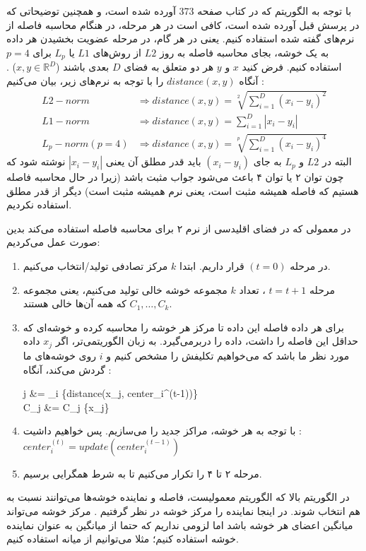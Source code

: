 \documentclass[a4paper, 12pt]{article}
\begin{document}
	
	با توجه به الگوریتم 
	که در کتاب 
	\cite{book}
	صفحه  373
	آورده شده است، و همچنین توضیحاتی که در پرسش قبل آورده شده است، کافی است در هر مرحله، در هنگام محاسبه فاصله از نرم‌های گفته شده استفاده کنیم. یعنی در هر گام، در مرحله عضویت بخشیدن هر داده به یک خوشه، بجای محاسبه فاصله به روز 
	$L2$
	از روش‌های 
	$L1$
	یا
	$L_p$
	برای 
	$p=4$
	استفاده کنیم. فرض کنید 
	$x$
	و
	$y$
	هر دو متعلق به فضای $D$ بعدی باشند 
	($x,y \in \mathbb{R}^D$)
	. آنگاه 
	$distance(x,y)$
	را با توجه به نرم‌های زیر، بیان می‌کنیم :
	\begin{align*}
		L2-norm &\Longrightarrow distance(x,y) = \sqrt[2]{\sum\limits_{i=1}^{D} (x_i - y_i)^2}
		\\
		L1-norm &\Longrightarrow distance(x,y) = \sum\limits_{i=1}^{D} |x_i - y_i|
		\\
		L_p-norm(p=4) &\Longrightarrow distance(x,y) = \sqrt[p]{\sum\limits_{i=1}^{D} (x_i - y_i)^4}	
	\end{align*}
	البته در 
	$L2$
	و 
	$L_p$
	به جای 
	$(x_i - y_i)$
	باید قدر مطلق آن یعنی 
	$|x_i - y_i|$
	نوشته شود که چون توان ۲ یا توان ۴ باعث می‌شود جواب مثبت باشد (زیرا در حال محاسبه فاصله هستیم که فاصله همیشه مثبت است، یعنی نرم همیشه مثبت است) دیگر از قدر مطلق استفاده نکردیم. 
	
	در 
	معمولی که در فضای اقلیدسی از نرم ۲ برای محاسبه فاصله استفاده می‌کند بدین صورت عمل می‌کردیم:
	\begin{enumerate}
		\item 
		در مرحله 
		$(t = 0)$
		قرار داریم.
		ابتدا $k$ مرکز تصادفی تولید/انتخاب می‌کنیم.
		\item
		مرحله 
		$t = t + 1$
		، تعداد 
		$k$
		مجموعه خوشه خالی تولید می‌کنیم، یعنی مجموعه 
		$C_1, \dots, C_k$
		که همه آن‌ها خالی هستند.
		\item
		برای هر داده فاصله این داده تا مرکز هر خوشه را محاسبه کرده و خوشه‌ای که حداقل این فاصله را داشت، داده را دربر‌می‌گیرد. به زبان الگوریتمی‌تر، اگر 
		$x_j$
		داده مورد نظر ما باشد که می‌خواهیم تکلیفش را مشخص کنیم و 
		$i$
		روی خوشه‌های ما گردش می‌کند، آنگاه : 
		\begin{flalign*}
		j &= \min_i \left\{distance(x_j, center_i^{(t-1)})\right\}
		\\
		C_j &= C_j \cup \left\{x_j\right\}	
		\end{flalign*}
		\item
		با توجه به هر خوشه، مراکز جدید را می‌سازیم.
		پس خواهیم داشیت :
		$center_i^{(t)} = update(center_i^{(t-1)})$
		
		\item
		مرحله ۲ تا ۴ را تکرار می‌کنیم تا به شرط همگرایی برسیم.
	\end{enumerate}
	در الگوریتم بالا که الگوریتم 
	معمولیست، فاصله و نماینده خوشه‌ها می‌توانند نسبت به هم انتخاب شوند. در اینجا نماینده را مرکز خوشه در نظر گرفتیم . مرکز خوشه می‌تواند میانگین اعضای هر خوشه باشد اما لزومی نداریم که حتما از میانگین به عنوان نماینده خوشه استفاده کنیم؛ مثلا می‌توانیم از میانه استفاده کنیم. 
	
\end{document}
